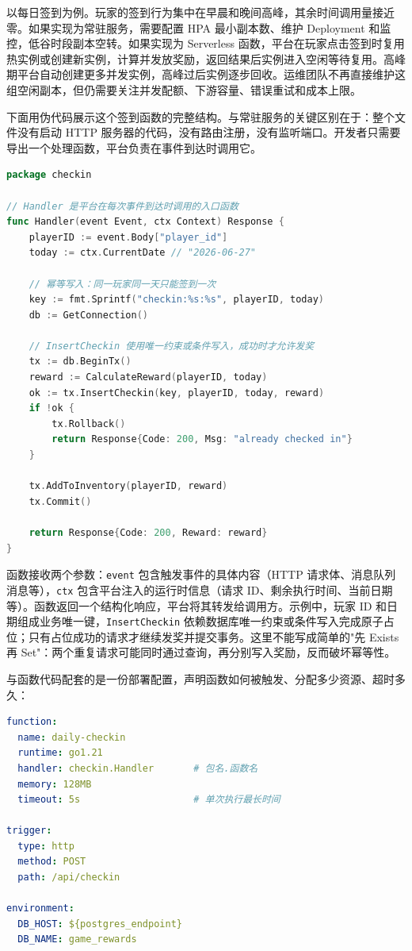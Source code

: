 以每日签到为例。玩家的签到行为集中在早晨和晚间高峰，其余时间调用量接近零。如果实现为常驻服务，需要配置 HPA 最小副本数、维护 Deployment 和监控，低谷时段副本空转。如果实现为 Serverless 函数，平台在玩家点击签到时复用热实例或创建新实例，计算并发放奖励，返回结果后实例进入空闲等待复用。高峰期平台自动创建更多并发实例，高峰过后实例逐步回收。运维团队不再直接维护这组空闲副本，但仍需要关注并发配额、下游容量、错误重试和成本上限。

下面用伪代码展示这个签到函数的完整结构。与常驻服务的关键区别在于：整个文件没有启动 HTTP 服务器的代码，没有路由注册，没有监听端口。开发者只需要导出一个处理函数，平台负责在事件到达时调用它。

\begin{tcolorbox}[title=签到奖励的 Serverless 函数实现]
\begin{lstlisting}[style=codeblock, language=go]
package checkin

// Handler 是平台在每次事件到达时调用的入口函数
func Handler(event Event, ctx Context) Response {
    playerID := event.Body["player_id"]
    today := ctx.CurrentDate // "2026-06-27"

    // 幂等写入：同一玩家同一天只能签到一次
    key := fmt.Sprintf("checkin:%s:%s", playerID, today)
    db := GetConnection()

    // InsertCheckin 使用唯一约束或条件写入，成功时才允许发奖
    tx := db.BeginTx()
    reward := CalculateReward(playerID, today)
    ok := tx.InsertCheckin(key, playerID, today, reward)
    if !ok {
        tx.Rollback()
        return Response{Code: 200, Msg: "already checked in"}
    }

    tx.AddToInventory(playerID, reward)
    tx.Commit()

    return Response{Code: 200, Reward: reward}
}
\end{lstlisting}
\end{tcolorbox}

函数接收两个参数：\texttt{event} 包含触发事件的具体内容（HTTP 请求体、消息队列消息等），\texttt{ctx} 包含平台注入的运行时信息（请求 ID、剩余执行时间、当前日期等）。函数返回一个结构化响应，平台将其转发给调用方。示例中，玩家 ID 和日期组成业务唯一键，\texttt{InsertCheckin} 依赖数据库唯一约束或条件写入完成原子占位；只有占位成功的请求才继续发奖并提交事务。这里不能写成简单的"先 Exists 再 Set"：两个重复请求可能同时通过查询，再分别写入奖励，反而破坏幂等性。

与函数代码配套的是一份部署配置，声明函数如何被触发、分配多少资源、超时多久：

\begin{tcolorbox}[title=签到函数的部署配置]
\begin{lstlisting}[style=codeblock, language=yaml]
function:
  name: daily-checkin
  runtime: go1.21
  handler: checkin.Handler       # 包名.函数名
  memory: 128MB
  timeout: 5s                    # 单次执行最长时间

trigger:
  type: http
  method: POST
  path: /api/checkin

environment:
  DB_HOST: ${postgres_endpoint}
  DB_NAME: game_rewards
\end{lstlisting}
\end{tcolorbox}

